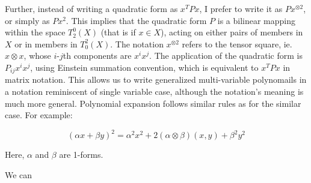 \documentclass[]{article}
\begin{document}
Further, instead of writing a quadratic form as $x^T P x$, I prefer to write it as $Px^{\otimes 2}$, or simply as $Px^2$.
This implies that the quadratic form $P$ is a bilinear mapping within the space $T^0_2(X)$ (that is if $x\in X$), acting on either pairs of members in $X$ or in members in $T^2_0(X)$.
The notation $x^{\otimes 2}$ refers to the tensor square, ie.\ $x\otimes x$, whose $i$-$j$th components are $x^ix^j$.
The application of the quadratic form is $P_{ij}x^ix^j$, using Einstein summation convention, which is equivalent to $x^T P x$ in matrix notation. 
This allows us to write generalized multi-variable polynomails in a notation reminiscent of single variable case, although the notation's meaning is much more general.
Polynomial expansion follows similar rules as for the similar case.
For example:

\begin{equation}
	(\alpha x+\beta y)^2 = \alpha^2 x^2 + 2(\alpha \otimes \beta)(x, y) + \beta^2 y^2
\end{equation}

Here, $\alpha$ and $\beta$ are 1-forms.

We can 
\end{document}
